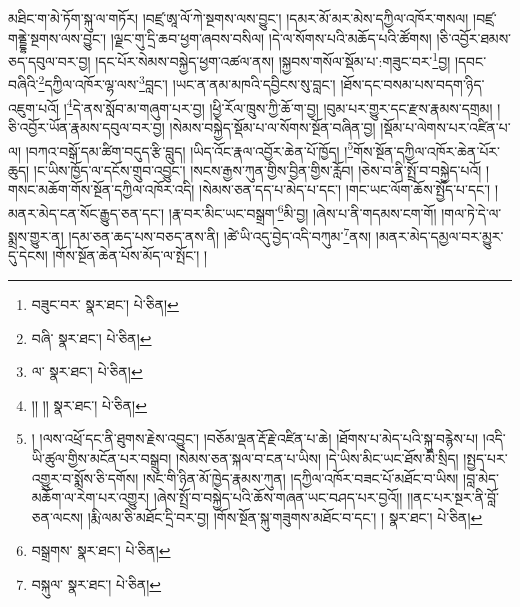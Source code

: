 མཐིང་ག་མེ་ཏོག་སྐུ་ལ་གཏོར། །བཛྲ་ཨཱ་ལོ་ཀེ་སྔགས་ལས་བྱུང་། །དམར་མོ་མར་མེས་དཀྱིལ་འཁོར་གསལ། །བཛྲ་གནྡྷེ་སྔགས་ལས་བྱུང་། །ལྗང་གུ་དྲི་ཆབ་ཕྱག་ཞབས་བསིལ། །དེ་ལ་སོགས་པའི་མཆོད་པའི་ཚོགས། །ཅི་འབྱོར་ཐམས་ཅད་དབུལ་བར་བྱ། །དང་པོར་སེམས་བསྐྱེད་ཕྱག་འཚལ་ནས། །སྐྱབས་གསོལ་སྡོམ་པ་:གཟུང་བར་\footnote{བཟུང་བར་  སྣར་ཐང་།  པེ་ཅིན། }བྱ། །དབང་བཞིའི་\footnote{བཞི་  སྣར་ཐང་།  པེ་ཅིན། }དཀྱིལ་འཁོར་ལྷ་ལས་\footnote{ལ་  སྣར་ཐང་།  པེ་ཅིན། }བླང་། །ཡང་ན་ནམ་མཁའི་དབྱིངས་སུ་བླང་། །ཐོས་དང་བསམ་པས་བདག་ཉིད་འཇུག་པའོ། །\footnote{།། །།  སྣར་ཐང་།  པེ་ཅིན། }དེ་ནས་སློབ་མ་གཞུག་པར་བྱ། །ཕྱི་རོལ་ཁྲུས་ཀྱི་ཆོ་ག་བྱ། །བུམ་པར་གྱུར་དང་རྫས་རྣམས་དགྲམ། །ཅི་འབྱོར་ཡོན་རྣམས་དབུལ་བར་བྱ། །སེམས་བསྐྱེད་སྡོམ་པ་ལ་སོགས་སྔོན་བཞིན་བྱ། །སྡོམ་པ་ལེགས་པར་འཛིན་པ་ལ། །བཀའ་བསྒོ་དམ་ཚིག་བདུད་རྩི་བླུད། །ཡིད་འོང་རྣལ་འབྱོར་ཆེན་པོ་ཁྱོད། །\footnote{། །ལས་འཕྲོ་དང་ནི་ཐུགས་རྗེས་འབྱུང་། །བཅོམ་ལྡན་རྡོ་རྗེ་འཛིན་པ་ཆེ། །ཐོགས་པ་མེད་པའི་སྐུ་བརྙེས་པ། །འདི་ཡི་ཚུལ་གྱིས་མངོན་པར་བསྒྲུབ། །སེམས་ཅན་སྐལ་བ་ངན་པ་ཡིས། །དེ་ཡིས་མིང་ཡང་ཐོས་མི་སྲིད། །སྤྱད་པར་འགྱུར་བ་སྨོས་ཅི་དགོས། །སང་གི་ཉིན་མོ་ཁྱེད་རྣམས་ཀུན། །དཀྱིལ་འཁོར་བཟང་པོ་མཐོང་བ་ཡིས། །བླ་མེད་མཆོག་ལ་རེག་པར་འགྱུར། །ཞེས་སྤྲོ་བ་བསྐྱེད་པའི་ཆོས་གཞན་ཡང་བཤད་པར་བྱའོ།། །།ནང་པར་སྔར་ནི་བློ་ཅན་ལངས། །རྨི་ལམ་ཅི་མཐོང་དྲི་བར་བྱ། །གོས་སྔོན་སྐུ་གཟུགས་མཐོང་བ་དང་། །  སྣར་ཐང་།  པེ་ཅིན། }གོས་སྔོན་དཀྱིལ་འཁོར་ཆེན་པོར་ཆུད། །ང་ཡིས་ཁྱོད་ལ་དངོས་གྲུབ་འབྱུང་། །སངས་རྒྱས་ཀུན་གྱིས་བྱིན་གྱིས་རློབ། །ཅེས་བ་ནི་སྤྲོ་བ་བསྐྱེད་པའོ། །གསང་མཆོག་གོས་སྔོན་དཀྱིལ་འཁོར་འདི། །སེམས་ཅན་དད་པ་མེད་པ་དང་། །གང་ཡང་ལོག་ཆོས་སྤྱོད་པ་དང་། །མནར་མེད་ངན་སོང་རྒྱུད་ཅན་དང་། །རྣ་བར་མིང་ཡང་བསྒྲག་\footnote{བསྒྲགས་  སྣར་ཐང་།  པེ་ཅིན། }མི་བྱ། །ཞེས་པ་ནི་གདམས་ངག་གོ། །གལ་ཏེ་དེ་ལ་སྨྲས་གྱུར་ན། །དམ་ཅན་ཆད་པས་བཅད་ནས་ནི། །ཚེ་ཡི་འདུ་བྱེད་འདི་བཀུམ་\footnote{བསྐུལ་  སྣར་ཐང་།  པེ་ཅིན། }ནས། །མནར་མེད་དམྱལ་བར་མྱུར་དུ་དེངས། །གོས་སྔོན་ཆེན་པོས་མོད་ལ་སྤོང་། །
